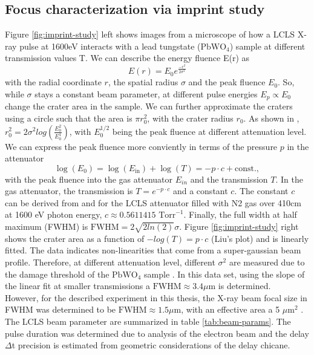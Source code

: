 \subsection{Focus characterization via imprint study}
Figure \ref{fig:imprint-study} left shows images from a microscope of how a LCLS X-ray pulse at 1600eV interacts with a lead tungstate ($\text{PbWO}_{4}$) sample at different transmission values T. We can describe the energy fluence E(r) as
\begin{equation}
E(r) = E_{0} e^{\frac{-r^{2}}{2 \sigma^{2}}} 
\end{equation}
with the radial coordinate $r$, the spatial radius $\sigma$ and the peak fluence $E_{0}$. So, while $\sigma$ stays a constant beam parameter, at different pulse energies $E_{p}\propto E_{0}$ change the crater area in the sample. We can further approximate the craters using a circle such that the area is $\pi r_{0}^{2}$, with the crater radius $r_{0}$. As shown in \citep{Liu-1982-OptLett}, $r_{0}^{2}=2\sigma^{2}log(\frac{E_{0}^{2}}{E_{0}^{1}})$, with $E_{0}^{1/2}$ being the peak fluence at different attenuation level. We can express the peak fluence more conviently in terms of the pressure $p$ in the attenuator
\begin{equation}
\log(E_{0}) = \log(E_{\text{in}})+\log(T)= -p \cdot c + \text{const.},
\label{eq:gaussian-beam-imprint}
\end{equation}
with the peak fluence into the gas attenuator $E_{in}$ and the transmission $T$. In the gas attenuator, the transmission is $T=e^{-p \cdot c}$ and a constant $c$. The constant $c$ can be derived from \citep{Henke-1993-ADNDT} and for the LCLS attenuator filled with N2 gas over 410cm at 1600 eV photon energy, $c\approx 0.5611415 \text{ Torr}^{-1}$. Finally, the full width at half maximum (FWHM) is $\text{FWHM}=2\sqrt{2 ln(2)}\sigma$. Figure \ref{fig:imprint-study} right shows the crater area as a function of $-log(T)= p \cdot c$ (Liu's plot) and is linearly fitted. The data indicates non-linearities that come from a super-gaussian beam profile. Therefore, at different attenuation level, different $\sigma^{2}$ are measured due to the damage threshold of the $\text{PbWO}_{4}$ sample \citep{Chalupsky-2010-OE,Chalupsky-2013-OE}. In this data set, using the slope of the linear fit at smaller transmissions a $\text{FWHM}\approx 3.4 \mu$m is determined.\\ 
However, for the described experiment in this thesis, the X-ray beam focal size in FWHM was determined to be $\text{FWHM}\approx 1.5\mu$m, with an effective area a 5 $\mu\text{m}^2$ \citep{Bucher-2016-Unpublished}. The LCLS beam parameter are summarized in table \ref{tab:beam-params}. The pulse duration was determined due to analysis of the electron beam and the delay $\Delta$t precision is estimated from geometric considerations of the delay chicane.
